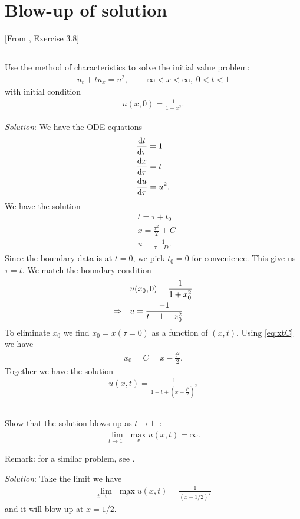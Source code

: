 \documentclass[11pt,letterpaper]{article}
\begin{document}
\section{Blow-up of solution}
[From \cite{ShearerLevy_15}, Exercise 3.8] 

\subsection{}
Use the method of characteristics to solve the initial value problem: 
\begin{align}
    u_t+tu_x = u^2,\quad -\infty<x<\infty,\; 0<t<1
\end{align}
with initial condition 
\begin{align}
    u(x,0) = \frac{1}{1+x^2}.
\end{align}

\textit{Solution}: We have the ODE equations
\begin{align}
    &\frac{\mathrm{d} t}{\mathrm{d} \tau} = 1\\
    &\frac{\mathrm{d} x}{\mathrm{d} \tau} = t\\
    &\frac{\mathrm{d} u}{\mathrm{d} \tau} = u^2.
\end{align}
We have the solution
\begin{align}
    &t = \tau+t_0\\
    &x = \frac{\tau^2}{2}+C\label{eq:xtC}\\
    &u = \frac{-1}{\tau+D}.
\end{align}
Since the boundary data is at $t=0$, we pick $t_0=0$ for convenience. This give us $\tau = t$. We match the boundary condition
\begin{align}
    &u(x_0,0) = \frac{1}{1+x_0^2}\\
    \Rightarrow \quad &u = \frac{-1}{t-1-x_0^2}
\end{align}
To eliminate $x_0$ we find $x_0=x(\tau=0)$ as a function of $(x,t)$. Using \eqref{eq:xtC} we have
\begin{align}
    x_0 = C = x-\frac{t^2}{2}.
\end{align}
Together we have the solution
\begin{align}
    u(x,t) = \frac{1}{1-t+(x-\frac{t^2}{2})^2}
\end{align}

\subsection{}
Show that the solution blows up as $t\to 1^-$:
\begin{align}
    \lim_{t\to 1^-} \max_x u(x,t) = \infty.
\end{align}

Remark: for a similar problem, see \cite[Exercise 2.2.11]{Olver_14}.

\textit{Solution}: Take the limit we have
\begin{align}
    \lim_{t\to 1^-} \max_x u(x,t) = \frac{1}{(x-1/2)^2}
\end{align}
and it will blow up at $x=1/2$.

    
\vfill
\printbibliography
\end{document}
